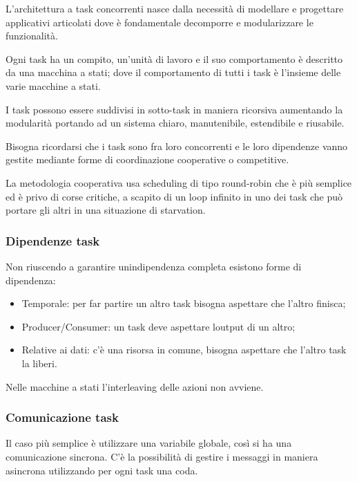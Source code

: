 L'architettura a task concorrenti nasce dalla necessità di modellare e
progettare applicativi articolati dove è fondamentale decomporre e
modularizzare le funzionalità.

Ogni task ha un compito, un'unità di lavoro e il suo comportamento è
descritto da una macchina a stati; dove il comportamento di tutti i task
è l'insieme delle varie macchine a stati.

I task possono essere suddivisi in sotto-task in maniera ricorsiva
aumentando la modularità portando ad un sistema chiaro, manutenibile,
estendibile e riusabile.

Bisogna ricordarsi che i task sono fra loro concorrenti e le loro
dipendenze vanno gestite mediante forme di coordinazione cooperative o
competitive.

La metodologia cooperativa usa scheduling di tipo round-robin che è più
semplice ed è privo di corse critiche, a scapito di un loop infinito in
uno dei task che può portare gli altri in una situazione di starvation.

\subsubsection{Dipendenze task}\label{dipendenze-task}

Non riuscendo a garantire un\textquotesingle indipendenza completa
esistono forme di dipendenza:

\begin{itemize}
\item
  Temporale: per far partire un altro task bisogna aspettare che l'altro
  finisca;
\item
  Producer/Consumer: un task deve aspettare l\textquotesingle output di
  un altro;
\item
  Relative ai dati: c'è una risorsa in comune, bisogna aspettare che
  l'altro task la liberi.
\end{itemize}

Nelle macchine a stati l'interleaving delle azioni non avviene.

\subsubsection{Comunicazione task}\label{comunicazione-task}

Il caso più semplice è utilizzare una variabile globale, così si ha una
comunicazione sincrona. C'è la possibilità di gestire i messaggi in
maniera asincrona utilizzando per ogni task una coda.

